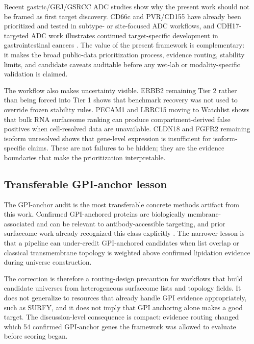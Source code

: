 \documentclass[preprint,12pt,authoryear]{elsarticle}
\begin{document}
Recent gastric/\allowbreak{}GEJ/\allowbreak{}GSRCC ADC studies show why the present work should not be framed as first target discovery. CD66c and PVR/\allowbreak{}CD155 have already been prioritized and tested in subtype- or site-focused ADC workflows, and CDH17-targeted ADC work illustrates continued target-specific development in gastrointestinal cancers \citep{zhang2025cd66c,zhao2026pvr,wang2025cdh17_adc}. The value of the present framework is complementary: it makes the broad public-data prioritization process, evidence routing, stability limits, and candidate caveats auditable before any wet-lab or modality-specific validation is claimed.

The workflow also makes uncertainty visible. ERBB2 remaining Tier 2 rather than being forced into Tier 1 shows that benchmark recovery was not used to override frozen stability rules. PECAM1 and LRRC15 moving to Watchlist shows that bulk RNA surfaceome ranking can produce compartment-derived false positives when cell-resolved data are unavailable. CLDN18 and FGFR2 remaining isoform unresolved shows that gene-level expression is insufficient for isoform-specific claims. These are not failures to be hidden;\allowbreak{} they are the evidence boundaries that make the prioritization interpretable.

\subsection{Transferable GPI-anchor lesson}

The GPI-anchor audit is the most transferable concrete methods artifact from this work. Confirmed GPI-anchored proteins are biologically membrane-associated and can be relevant to antibody-accessible targeting, and prior surfaceome work already recognized this class explicitly \citep{bauschfluck2018surfy}. The narrower lesson is that a pipeline can under-credit GPI-anchored candidates when list overlap or classical transmembrane topology is weighted above confirmed lipidation evidence during universe construction.

The correction is therefore a routing-design precaution for workflows that build candidate universes from heterogeneous surfaceome lists and topology fields. It does not generalize to resources that already handle GPI evidence appropriately, such as SURFY, and it does not imply that GPI anchoring alone makes a good target. The discussion-level consequence is compact: evidence routing changed which 54 confirmed GPI-anchor genes the framework was allowed to evaluate before scoring began.
\end{document}
